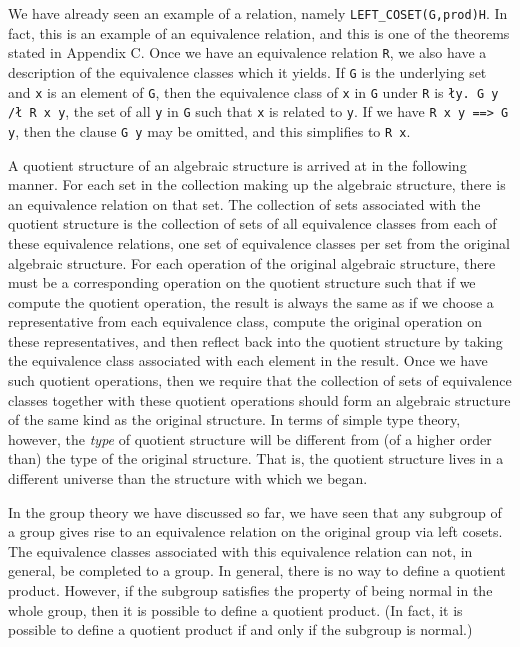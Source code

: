 We have already seen an example of a relation, namely
{\tt LEFT\_COSET(G,prod)H}.  In fact, this is an example of an
equivalence relation, and this is one of the theorems stated in
Appendix C.  Once we have an equivalence relation {\tt R}, we also
have a description of the equivalence classes which it yields.  If
{\tt G} is the underlying set and {\tt x} is an element of {\tt G},
then the equivalence class of {\tt x} in {\tt G} under {\tt R} is
{\tt {\l}y.~G y /{\l} R x y}, the set of all {\tt y} in {\tt G} such that
{\tt x} is related to {\tt y}.  If we have {\tt R x y ==> G y}, then
the clause {\tt G y} may be omitted, and this simplifies to {\tt R x}.

A quotient structure of an algebraic structure is arrived at in the
following manner.  For each set in the collection making up the
algebraic structure, there is an equivalence relation on that set.  The
collection of sets associated with the quotient structure is the
collection of sets of all equivalence classes from each of these
equivalence relations, one set of equivalence classes per set from the
original algebraic structure.  For each operation of the original
algebraic structure, there must be a corresponding operation on the
quotient structure such that if we compute the quotient operation,
the result is always the same as if we choose a representative from
each equivalence class, compute the original operation on these
representatives, and then reflect back into the quotient structure by
taking the equivalence class associated with each element in the
result.  Once we have such quotient operations, then we require that
the collection of sets of equivalence classes together with these
quotient operations should form an algebraic structure of the same
kind as the original structure.  In terms of simple type theory,
however, the {\it type\/} of quotient structure will be different from
(of a higher order than) the type of the original structure.  That is,
the quotient structure lives in a different universe than the
structure with which we began.

In the group theory we have discussed so far, we have seen that any
subgroup of a group gives rise to an equivalence relation on the
original group via left cosets.  The equivalence classes associated
with this equivalence relation can not, in general, be completed to a
group.  In general, there is no way to define a quotient product.
However, if the subgroup satisfies the property of being normal in the
whole group, then it is possible to define a quotient product.  (In
fact, it is possible to define a quotient product if and only if the
subgroup is normal.)

